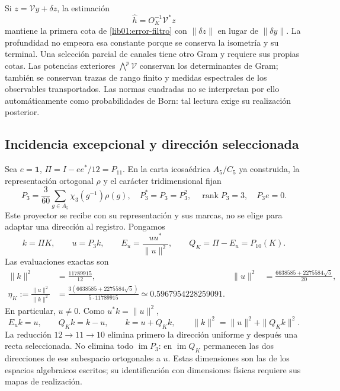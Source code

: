 Si \(z=\mathcal Vy+\delta z\), la estimación
\[
 \widehat h=O_K^{-1}\mathcal V^*z
\]
mantiene la primera cota de \eqref{lib01:error-filtro} con
\(\|\delta z\|\) en lugar de \(\|\delta y\|\). La profundidad
no empeora esa constante porque se conserva la isometría y su terminal.
Una selección parcial de canales tiene otro Gram y requiere sus propias
cotas. Las potencias exteriores \(\bigwedge^p\mathcal V\) conservan
los determinantes de Gram; también se conservan trazas de rango finito y
medidas espectrales de los observables transportados. Las normas
cuadradas no se interpretan por ello automáticamente como probabilidades
de Born: tal lectura exige su realización posterior.

\subsection{Incidencia excepcional y dirección seleccionada}
\label{lib01:direccion}

Sea \(e=\mathbf1\), \(\Pi=I-ee^*/12=P_{11}\). En la carta
icosaédrica \(A_5/C_5\) ya construida, la representación ortogonal
\(\rho\) y el carácter tridimensional fijan
\begin{equation}
 P_3=\frac3{60}\sum_{g\in A_5}\chi_3(g^{-1})\rho(g),
 \quad P_3^*=P_3=P_3^2,\quad
 \operatorname{rank}P_3=3,\quad P_3e=0.
 \label{lib01:P3}
\end{equation}
Este proyector se recibe con su representación y sus marcas, no se elige
para adaptar una dirección al registro. Pongamos
\[
 k=\Pi K,\qquad u=P_3k,\qquad
 E_u=\frac{uu^*}{\|u\|^2},\qquad Q_K=\Pi-E_u=P_{10}(K).
\]
Las evaluaciones exactas son
\begin{align}
 \|k\|^2&=\frac{11789915}{12},&
 \|u\|^2&=\frac{6638585+2275584\sqrt5}{20},
 \label{lib01:normas-direccion}\\
 \eta_K:=\frac{\|u\|^2}{\|k\|^2}
 &=\frac{3(6638585+2275584\sqrt5)}{5\cdot11789915}
 \simeq0.5967954228259091.
 \label{lib01:eta}
\end{align}
En particular, \(u\ne0\). Como \(u^*k=\|u\|^2\),
\begin{equation}
 E_uk=u,\qquad Q_Kk=k-u,\qquad
 k=u+Q_Kk,\qquad \|k\|^2=\|u\|^2+\|Q_Kk\|^2.
 \label{lib01:particion-direccion}
\end{equation}
La reducción \(12\to11\to10\) elimina primero la dirección uniforme
y después una recta seleccionada. No elimina todo \(\operatorname{im}P_3\):
en \(\operatorname{im}Q_K\) permanecen las dos direcciones de ese
subespacio ortogonales a \(u\). Estas dimensiones son las de los
espacios algebraicos escritos; su identificación con dimensiones físicas
requiere sus mapas de realización.

